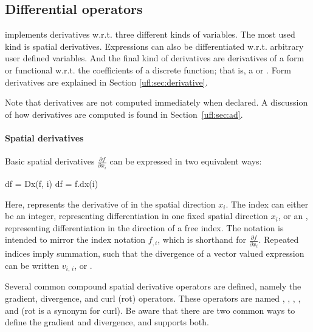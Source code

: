 \subsection{Differential operators} \label{ufl:sec:differential}
\index{$\nabla$}

\ufl{} implements derivatives w.r.t. three different kinds of variables.
The most used kind is spatial derivatives.  Expressions can also be
differentiated w.r.t. arbitrary user defined variables.  And the final
kind of derivatives are derivatives of a form or functional w.r.t. the
coefficients of a discrete function; that is, a 
or .  Form derivatives are explained in Section
\ref{ufl:sec:derivative}.

Note that derivatives are not computed immediately when declared.
A discussion of how derivatives are computed is found in
Section~\ref{ufl:sec:ad}.

\paragraph{Spatial derivatives}
\label{ufl:sec:dx}

Basic spatial derivatives $\frac{\partial f}{\partial x_i}$ can be
expressed in two equivalent ways:
\begin{uflcode}
df = Dx(f, i)
df = f.dx(i)
\end{uflcode}
Here,  represents the derivative of  in the spatial
direction $x_i$. The index  can either be an integer, representing
differentiation in one fixed spatial direction $x_i$, or an ,
representing differentiation in the direction of a free index.
The notation  is intended to mirror the index notation
$f_{,i}$, which is shorthand for $\frac{\partial f}{\partial x_i}$.
Repeated indices imply summation, such that the divergence of a vector
valued expression  can be written $v_{i,\,i}$, or .

Several common compound spatial derivative operators are defined,
namely the gradient, divergence, and curl (rot) operators.
These operators are named , ,
, ,
 and  (rot is a synonym for curl).
Be aware that there are two common ways to define the
gradient and divergence, and \ufl{} supports both.

